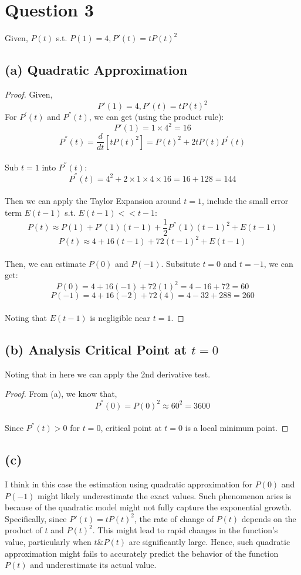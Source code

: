 \documentclass{article}
\begin{document}
\section*{Question 3}
Given, $P(t)$ s.t. $P(1) = 4, P'(t) = tP(t)^2$

\subsection*{(a) Quadratic Approximation}
\begin{proof}
    Given,
    \[ P'(1) = 4, P'(t) = tP(t)^2 \]
    For $P^{'}(t)$ and $P^{''}(t)$, we can get (using the product rule):
    \\
    \[ P'(1) = 1 \times 4^2 = 16 \]
    \[ P^{''}(t) = \frac{d}{dt}[tP(t)^2] = P(t)^2 + 2tP(t)P^{'}(t)\]
    \\
    Sub $t = 1$ into $P^{''}(t)$:
    \[ P^{''}(t) = 4^2 + 2 \times 1 \times 4 \times 16 = 16 + 128 = 144 \]
    \\
    Then we can apply the Taylor Expansion around $t = 1$, include the small error term $E(t-1)$ s.t. $E(t-1) << t-1$:
    \[ P(t) \approx P(1) + P'(1)(t - 1) + \frac{1}{2}P^{''}(1)(t - 1)^2 + E(t - 1) \]
    \[ P(t) \approx 4 + 16(t - 1) + 72(t - 1)^2 + E(t - 1) \]
    \\
    Then, we can estimate $P(0)$ and $P(-1)$. Subsitute $t = 0$ and $t = -1$, we can get:
    \[ P(0) = 4 + 16(-1) + 72(1)^2 = 4 - 16 + 72 = 60 \]
    \[ P(-1) = 4 + 16(-2) + 72(4) = 4 - 32 + 288 = 260 \]
    \\
    Noting that $E(t - 1)$ is negligible near $t = 1$.
\end{proof}

\subsection*{(b) Analysis Critical Point at $t = 0$}
Noting that in here we can apply the 2nd derivative test.
\begin{proof}
    From (a), we know that,
    \[ P^{''}(0) = P(0)^2 \approx 60^2 = 3600 \]
    \\
    Since $P^{''}(t) > 0$ for $t = 0$, critical point at $t = 0$ is a local minimum point.
\end{proof}

\subsection*{(c)}
I think in this case the estimation using quadratic approximation for $P(0)$ and $P(-1)$ might likely underestimate the exact values. Such phenomenon aries is 
because of the quadratic model might not fully capture the exponential growth.
Specifically, since $P'(t) = tP(t)^2$, the rate of change of $P(t)$ depends on the product of $t$ and $P(t)^2$. This might lead to rapid changes in the function's value, 
particularly when $t \& P(t)$ are significantly large.
Hence, such quadratic approximation might fails to accurately predict the behavior of the function $P(t)$ and underestimate its actual value.
\end{document}
